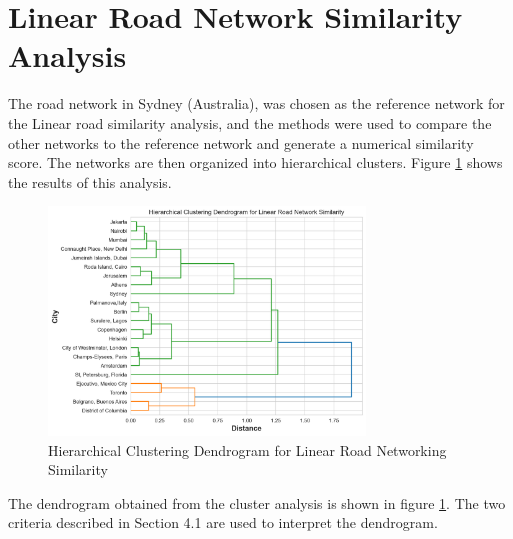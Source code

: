 \section{Linear Road Network Similarity Analysis}

The road network in Sydney (Australia), was chosen as the reference network for the Linear road similarity analysis, and the methods were used to compare the other networks to the reference network and generate a numerical similarity score. The networks are then organized into hierarchical clusters. Figure \ref{fig:Hierarchical Clustering Dendrogram for Linear Road Networking Similarity} shows the results of this analysis.

\begin{figure}[!ht]
\centering
\includegraphics[width=0.75\textwidth,center]{picture/Linear/linear_dendrogram2.png}
\caption[Hierarchical Clustering Dendrogram for Linear Road Networking Similarity]{Hierarchical Clustering Dendrogram for Linear Road Networking Similarity}
\label{fig:Hierarchical Clustering Dendrogram for Linear Road Networking Similarity}
\end{figure}

The dendrogram obtained from the cluster analysis is shown in figure \ref{fig:Hierarchical Clustering Dendrogram for Linear Road Networking Similarity}. The two criteria described in Section 4.1 are used to interpret the dendrogram.

